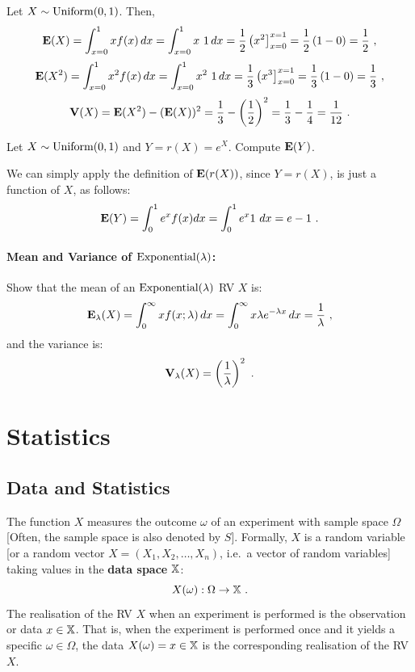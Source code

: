 \begin{example}
Let $X \sim \mbox{{\rm Uniform}}(0,1)$.  Then, 
\[
\mathbf{E}(X) = \int_{x=0}^1 x f(x)\, dx = \int_{x=0}^1 x \ 1 \, dx = \frac{1}{2} \left( x^2 \right]_{x=0}^{x=1} = \frac{1}{2} \left( 1-0 \right) = \frac{1}{2} \ ,
\]
\[
\mathbf{E}(X^2) = \int_{x=0}^1 x^2 f(x)\, dx = \int_{x=0}^1 x^2 \ 1 \, dx =  \frac{1}{3} \left( x^3 \right]_{x=0}^{x=1} = \frac{1}{3} \left( 1-0 \right) = \frac{1}{3} \ ,
\]
\[
\mathbf{V}(X) = \mathbf{E}(X^2) - (\mathbf{E}(X))^2 = \frac{1}{3}  - \left( \frac{1}{2} \right)^2  = \frac{1}{3}  - \frac{1}{4} = \frac{1}{12} \ .
\]
\end{example}

\begin{example}
Let $X \sim \mbox{{\rm Uniform}}(0,1)$ and $Y=r(X)=e^X$.  Compute $\mathbf{E}(Y)$. 

We can simply apply the definition of $\mathbf{E}(r(X))$, since $Y=r(X)$, is just a function of $X$, as follows: 
\[
\mathbf{E}(Y) = \int_0^1 e^x f(x) dx = \int_0^1 e^x 1 \ dx = e-1 \ .
\]
\end{example}

\paragraph{Mean and Variance of $\mbox{{\rm Exponential}}(\lambda)$:}
Show that the mean of an $\mbox{{\rm Exponential}}(\lambda)$ RV $X$ is:
\[
\mathbf{E}_{\lambda}(X) = \int_{0}^{\infty} x f(x;\lambda)\,dx
=   \int_{0}^{\infty} x \lambda e^{-\lambda x}\,dx
= \frac{1}{\lambda} \ ,
\]
and the variance is:
\[
\mathbf{V}_{\lambda}(X) = \left(  \frac{1}{\lambda} \right)^2 \ .
\]

\section{Statistics}\label{S:Statistics}

\subsection{Data and Statistics}\label{S:DataStats}

\begin{definition}[Data]
The function $X$ measures the outcome $\omega$ of an experiment with sample space $\Omega$ [Often, the sample space is also denoted by $S$].  Formally, $X$ is a random variable [or a random vector $X=(X_1,X_2,\ldots,X_n)$, i.e.~a vector of random variables] taking  values in the {\bf data space} $\mathbb{X}$:
\[
X(\omega):\Omega \to \mathbb{X} \ .
\]
The realisation of the RV $X$ when an experiment is performed is the observation or data $x \in \mathbb{X}$.  That is, when the experiment is performed once and it yields a specific $\omega \in \Omega$, the data $X(\omega)=x \in \mathbb{X}$ is the corresponding realisation of the RV $X$.
\end{definition}


